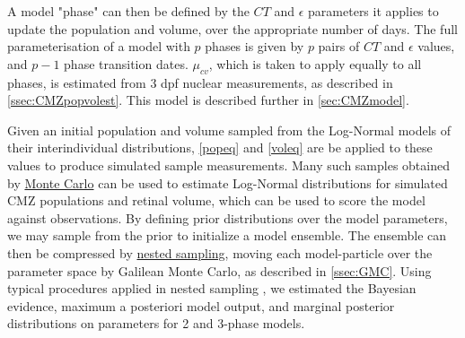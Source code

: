 \documentclass{ut-thesis}
\begin{document}
\begin{NoHyper}
A model "phase" can then be defined by the $CT$ and $\epsilon$ parameters it applies to update the population and volume, over the appropriate number of days. The full parameterisation of a model with $p$ phases is given by $p$ pairs of $CT$ and $\epsilon$ values, and $p-1$ phase transition dates. $\mu_{cv}$, which is taken to apply equally to all phases, is estimated from 3 dpf nuclear measurements, as described in \autoref{ssec:CMZpopvolest}. This model is described further in \autoref{sec:CMZmodel}.

Given an initial population and volume sampled from the Log-Normal models of their interindividual distributions, \autoref{popeq} and \autoref{voleq} are be applied to these values to produce simulated sample measurements. Many such samples obtained by \hyperref[ssec:MonteCarlo]{Monte Carlo} can be used to estimate Log-Normal distributions for simulated CMZ populations and retinal volume, which can be used to score the model against observations. By defining prior distributions over the model parameters, we may sample from the prior to initialize a model ensemble. The ensemble can then be compressed by \hyperref[ssec:nested]{nested sampling}, moving each model-particle over the parameter space by Galilean Monte Carlo, as described in \autoref{ssec:GMC}. Using typical procedures applied in nested sampling \cite{Skilling2006}, we estimated the Bayesian evidence, maximum a posteriori model output, and marginal posterior distributions on parameters for 2 and 3-phase models.


\end{NoHyper}
\end{document}
